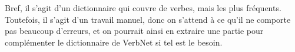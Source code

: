 Bref, il s'agit d'un dictionnaire qui couvre de verbes, mais les plus fréquents. Toutefois, il s'agit d'un travail manuel, donc on s'attend à ce qu'il ne comporte pas beaucoup d'erreurs, et on pourrait ainsi en extraire une partie pour complémenter le dictionnaire de VerbNet si tel est le besoin.


